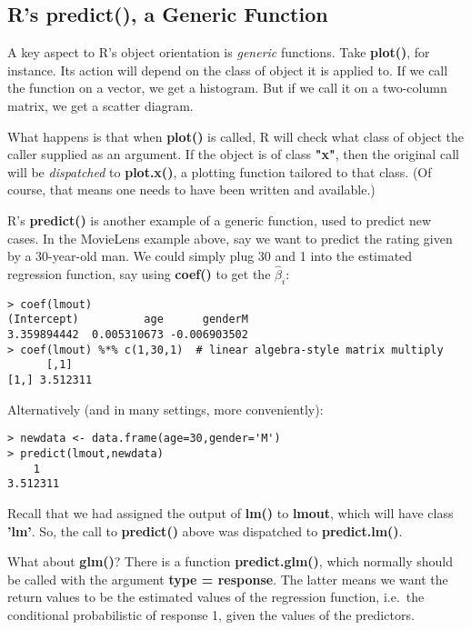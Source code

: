 \subsection{R's predict(), a Generic Function}

A key aspect to R's object orientation is \textit{generic} functions.
Take \textbf{plot()}, for instance.  Its action will depend on the class
of object it is applied to.  If we call the function on a vector, we get
a histogram.  But if we call it on a two-column matrix, we get a scatter
diagram.

What happens is that when \textbf{plot()} is called, R will check what
class of object the caller supplied as an argument.  If the object is of
class \textbf{"x"}, then the original call will be \textit{dispatched}
to \textbf{plot.x()}, a plotting function tailored to that class.  (Of
course, that means one needs to have been written and available.)

R's \textbf{predict()} is another example of a generic function, used to
predict new cases.  In the MovieLens example above, say we want to
predict the rating given by a 30-year-old man.  We could simply plug
30 and 1 into the estimated regression function, say using
\textbf{coef()} to get the $\widehat{\beta}_i$:

\begin{lstlisting}
> coef(lmout)
(Intercept)          age      genderM 
3.359894442  0.005310673 -0.006903502 
> coef(lmout) %*% c(1,30,1)  # linear algebra-style matrix multiply
      [,1]
[1,] 3.512311
\end{lstlisting}

Alternatively (and in many settings, more conveniently):

\begin{lstlisting}
> newdata <- data.frame(age=30,gender='M')
> predict(lmout,newdata)
    1 
3.512311 
\end{lstlisting}

Recall that we had assigned the output of \textbf{lm()} to
\textbf{lmout}, which will have class \textbf{'lm'}.  So, the call to
\textbf{predict()} above was dispatched to \textbf{predict.lm()}.

What about \textbf{glm()}?  There is a function \textbf{predict.glm()},
which normally should be called with the argument \textbf{type =
response}.  The latter means we want the return values to be the
estimated values of the regression function, i.e.\ the conditional
probabilistic of response 1, given the values of the predictors.

